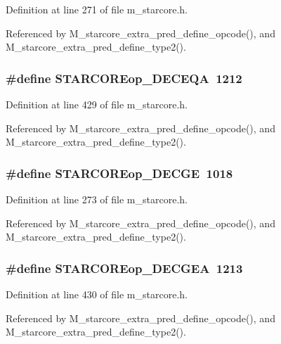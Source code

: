 Definition at line 271 of file m\_\-starcore.h.

Referenced by M\_\-starcore\_\-extra\_\-pred\_\-define\_\-opcode(), and M\_\-starcore\_\-extra\_\-pred\_\-define\_\-type2().
\subsubsection{\setlength{\rightskip}{0pt plus 5cm}\#define STARCOREop\_\-DECEQA~1212}\label{m__starcore_8h_db1233876e260ebdbcdba4ac8c07ef6e}




Definition at line 429 of file m\_\-starcore.h.

Referenced by M\_\-starcore\_\-extra\_\-pred\_\-define\_\-opcode(), and M\_\-starcore\_\-extra\_\-pred\_\-define\_\-type2().
\subsubsection{\setlength{\rightskip}{0pt plus 5cm}\#define STARCOREop\_\-DECGE~1018}\label{m__starcore_8h_d77810158e173f4bf54efb53534f13a0}




Definition at line 273 of file m\_\-starcore.h.

Referenced by M\_\-starcore\_\-extra\_\-pred\_\-define\_\-opcode(), and M\_\-starcore\_\-extra\_\-pred\_\-define\_\-type2().
\subsubsection{\setlength{\rightskip}{0pt plus 5cm}\#define STARCOREop\_\-DECGEA~1213}\label{m__starcore_8h_fe7753cef4684383baf3ed19efc52f8c}




Definition at line 430 of file m\_\-starcore.h.

Referenced by M\_\-starcore\_\-extra\_\-pred\_\-define\_\-opcode(), and M\_\-starcore\_\-extra\_\-pred\_\-define\_\-type2().
